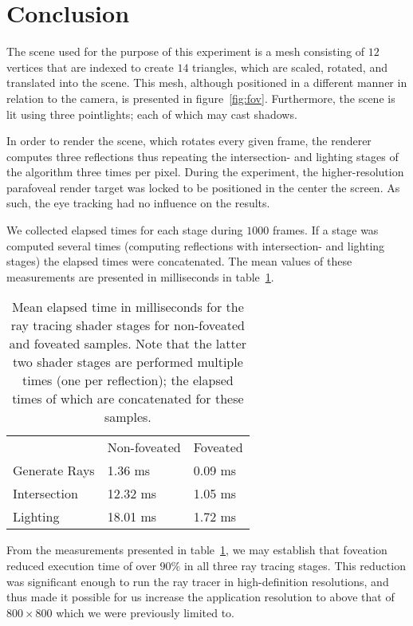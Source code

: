 
\section{Conclusion}
The scene used for the purpose of this experiment is a mesh consisting of $12$ vertices that are indexed to create $14$ triangles, which are scaled, rotated, and translated into the scene.
This mesh, although positioned in a different manner in relation to the camera, is presented in figure~\ref{fig:fov}.
Furthermore, the scene is lit using three pointlights; each of which may cast shadows.

In order to render the scene, which rotates every given frame, the renderer computes three reflections thus repeating the intersection- and lighting stages of the algorithm three times per pixel.
During the experiment, the higher-resolution parafoveal render target was locked to be positioned in the center the screen.
As such, the eye tracking had no influence on the results.

We collected elapsed times for each stage during $1000$ frames.
If a stage was computed several times (computing reflections with intersection- and lighting stages) the elapsed times were concatenated.
The mean values of these measurements are presented in milliseconds in table~\ref{tab:res}.

\begin{table}[h]
\begin{tabular}{lll}
  & Non-foveated & Foveated \\
  Generate Rays & 1.36\phantom{0} ms & 0.09 ms \\
  Intersection & 12.32 ms & 1.05 ms \\
  Lighting & 18.01 ms & 1.72 ms
\end{tabular}
\caption{Mean elapsed time in milliseconds for the ray tracing shader stages for non-foveated and foveated samples. Note that the latter two shader stages are performed multiple times (one per reflection); the elapsed times of which are concatenated for these samples.}
\label{tab:res}
\end{table}

From the measurements presented in table~\ref{tab:res}, we may establish that foveation reduced execution time of over $90\%$ in all three ray tracing stages.
This reduction was significant enough to run the ray tracer in high-definition resolutions, and thus made it possible for us increase the application resolution to above that of $800\times 800$ which we were previously limited to.

